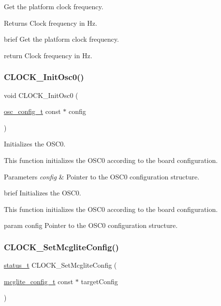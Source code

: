 Get the platform clock frequency. 

\begin{DoxyReturn}{Returns}
Clock frequency in Hz.
\end{DoxyReturn}
brief Get the platform clock frequency.

return Clock frequency in Hz. \mbox{\label{group__clock_ga7fd566b301526150b4e2be076006029f}} 
\subsubsection{\texorpdfstring{CLOCK\_InitOsc0()}{CLOCK\_InitOsc0()}}
{\footnotesize\ttfamily void C\+L\+O\+C\+K\+\_\+\+Init\+Osc0 (\begin{DoxyParamCaption}\item[{\mbox{\hyperlink{group__clock_ga7b42afca82c7234da7c1ccd5fc4d984b}{osc\+\_\+config\+\_\+t}} const $\ast$}]{config }\end{DoxyParamCaption})}



Initializes the O\+S\+C0. 

This function initializes the O\+S\+C0 according to the board configuration.


\begin{DoxyParams}{Parameters}
{\em config} & Pointer to the O\+S\+C0 configuration structure.\\
\hline
\end{DoxyParams}
brief Initializes the O\+S\+C0.

This function initializes the O\+S\+C0 according to the board configuration.

param config Pointer to the O\+S\+C0 configuration structure. \mbox{\label{group__clock_ga5e63d4acf979a66bf5b332ca27b9d1cc}} 
\subsubsection{\texorpdfstring{CLOCK\_SetMcgliteConfig()}{CLOCK\_SetMcgliteConfig()}}
{\footnotesize\ttfamily \mbox{\hyperlink{group__ksdk__common_gaaabdaf7ee58ca7269bd4bf24efcde092}{status\+\_\+t}} C\+L\+O\+C\+K\+\_\+\+Set\+Mcglite\+Config (\begin{DoxyParamCaption}\item[{\mbox{\hyperlink{group__clock_gaabff5dfd46b7233a64d3f3e4b47d908d}{mcglite\+\_\+config\+\_\+t}} const $\ast$}]{target\+Config }\end{DoxyParamCaption})}



